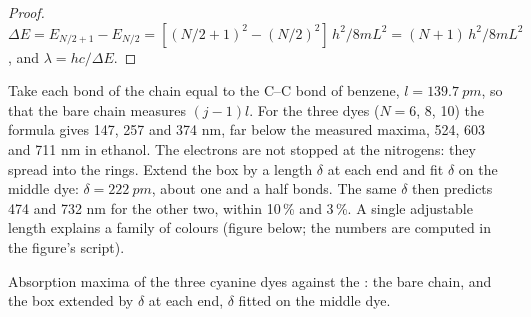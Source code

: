 \begin{proof}
$\Delta E = E_{N/2+1} - E_{N/2} = [(N/2+1)^2 - (N/2)^2]\,h^2/8mL^2 =
(N+1)\,h^2/8mL^2$, and $\lambda = hc/\Delta E$.
\end{proof}

\begin{example}\label{ex:b3:quantum-model-systems:dyes}
Take each bond of the chain equal to the C--C bond of benzene,
$l = \qty{139.7}{pm}$, so that the bare chain measures $(j - 1)l$. For the
three dyes ($N = 6$, 8, 10) the formula gives 147, 257 and 374 nm, far
below the measured maxima, 524, 603 and 711 nm in ethanol. The electrons
are not stopped at the nitrogens: they spread into the rings. Extend the
box by a length $\delta$ at each end and fit $\delta$ on the middle dye:
$\delta = \qty{222}{pm}$, about one and a half bonds. The same $\delta$ then
predicts 474 and 732 nm for the other two, within 10\,\% and 3\,\%. A single
adjustable length explains a family of colours (figure below; the numbers are
computed in the figure's script).
\end{example}

\begin{omfigure}

{\small Absorption maxima of the three cyanine dyes against the
: the bare chain, and the box extended by $\delta$ at
each end, $\delta$ fitted on the middle dye.}
\end{omfigure}


